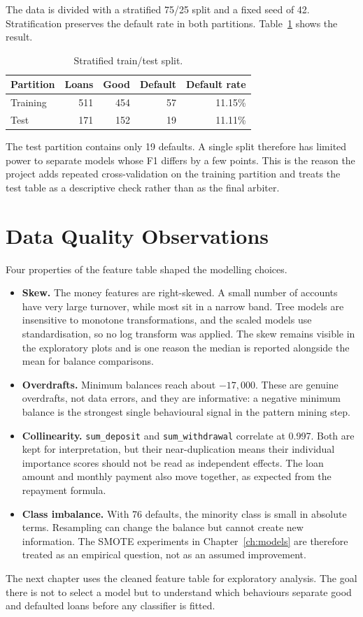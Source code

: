 The data is divided with a stratified 75/25 split and a fixed seed of 42. Stratification preserves the default rate in both partitions. Table~\ref{tab:split} shows the result.

\begin{table}[H]
    \centering
    \caption{Stratified train/test split.}
    \label{tab:split}
    \begin{tabular}{@{}lrrrr@{}}
        \toprule
        \textbf{Partition} & \textbf{Loans} & \textbf{Good} & \textbf{Default} & \textbf{Default rate} \\
        \midrule
        Training & 511 & 454 & 57 & 11.15\% \\
        Test & 171 & 152 & 19 & 11.11\% \\
        \bottomrule
    \end{tabular}
\end{table}

The test partition contains only 19 defaults. A single split therefore has limited power to separate models whose F1 differs by a few points. This is the reason the project adds repeated cross-validation on the training partition and treats the test table as a descriptive check rather than as the final arbiter.

\section{Data Quality Observations}
\label{sec:data-quality}

Four properties of the feature table shaped the modelling choices.

\begin{itemize}
    \item \textbf{Skew.} The money features are right-skewed. A small number of accounts have very large turnover, while most sit in a narrow band. Tree models are insensitive to monotone transformations, and the scaled models use standardisation, so no log transform was applied. The skew remains visible in the exploratory plots and is one reason the median is reported alongside the mean for balance comparisons.
    \item \textbf{Overdrafts.} Minimum balances reach about $-17{,}000$. These are genuine overdrafts, not data errors, and they are informative: a negative minimum balance is the strongest single behavioural signal in the pattern mining step.
    \item \textbf{Collinearity.} \texttt{sum\_deposit} and \texttt{sum\_withdrawal} correlate at 0.997. Both are kept for interpretation, but their near-duplication means their individual importance scores should not be read as independent effects. The loan amount and monthly payment also move together, as expected from the repayment formula.
    \item \textbf{Class imbalance.} With 76 defaults, the minority class is small in absolute terms. Resampling can change the balance but cannot create new information. The SMOTE experiments in Chapter~\ref{ch:models} are therefore treated as an empirical question, not as an assumed improvement.
\end{itemize}

The next chapter uses the cleaned feature table for exploratory analysis. The goal there is not to select a model but to understand which behaviours separate good and defaulted loans before any classifier is fitted.
